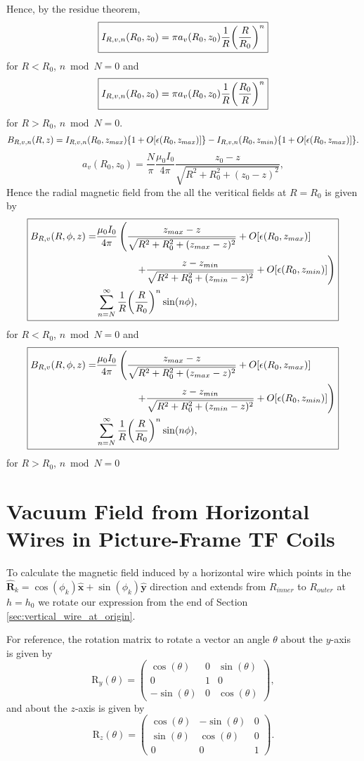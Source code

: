 \documentclass{article}
\begin{document}
Hence, by the residue theorem,
\[\boxed{I_{R,v,n}(R_0, z_0) = \pi a_v(R_0, z_0) \frac{1}{R}\qty(\frac{R}{R_0})^n}\]
for $R<R_0$, $n \bmod{N} = 0$
and
\[\boxed{I_{R,v,n}(R_0, z_0) = \pi a_v(R_0, z_0) \frac{1}{R}\qty(\frac{R_0}{R})^n}\]
for $R>R_0$, $n \bmod{N} = 0$.
\[\begin{aligned}
B_{R, v, n}(R, z)= I_{R,v,n}(R_0, z_{max})\qty{1+O[\epsilon(R_0, z_{max})]} - I_{R,v,n}(R_0, z_{min})\qty{1+O[\epsilon(R_0, z_{max})]}.
\end{aligned}\]
\[a_v(R_0, z_0)=\frac{N}{\pi}\frac{\mu_0 I_0}{4\pi}\frac{z_0-z}{\sqrt{R^2+R_0^2+(z_0-z)^2}},\]
Hence the radial magnetic field from the all the veritical fields at $R=R_0$ is given by
\[\boxed{
\begin{aligned}
B_{R,v}(R, \phi, z)=&\frac{\mu_0 I_0}{4\pi}\left(\frac{z_{max}-z}{\sqrt{R^2+R_0^2+(z_{max}-z)^2}}+O[\epsilon(R_0, z_{max})]\right. \\
& \qquad\qquad\left.+\frac{z-z_{min}}{\sqrt{R^2+R_0^2+(z_{min}-z)^2}}+O[\epsilon(R_0, z_{min})]\right) \\
& \sum_{n=N}^\infty \frac{1}{R}\qty(\frac{R}{R_0})^n\sin(n\phi),
\end{aligned}}
\]
for $R<R_0$, $n \bmod{N} = 0$ and
\[\boxed{
\begin{aligned}
B_{R,v}(R, \phi, z)=&\frac{\mu_0 I_0}{4\pi}\left(\frac{z_{max}-z}{\sqrt{R^2+R_0^2+(z_{max}-z)^2}}+O[\epsilon(R_0, z_{max})]\right. \\
& \qquad\qquad\left.+\frac{z-z_{min}}{\sqrt{R^2+R_0^2+(z_{min}-z)^2}}+O[\epsilon(R_0, z_{min})]\right) \\
& \sum_{n=N}^\infty \frac{1}{R}\qty(\frac{R}{R_0})^n\sin(n\phi),
\end{aligned}}
\]
for $R>R_0$, $n \bmod{N} = 0$


\section{Vacuum Field from Horizontal Wires in Picture-Frame TF Coils}

To calculate the magnetic field induced by a horizontal wire which points in the $\mathbf{\hat{R}}_k=\cos(\phi_k)\mathbf{\hat{x}} + \sin(\phi_k)\mathbf{\hat{y}}$
direction and extends from $R_{inner}$ to $R_{outer}$ at $h=h_0$ we rotate our expression
from the end of Section \ref{sec:vertical_wire_at_origin}.

For reference, the rotation matrix to rotate a vector an angle $\theta$ about the
$y$-axis is given by
\[\text{R}_y(\theta) = \begin{pmatrix}
    \cos(\theta) & 0 & \sin(\theta) \\
    0 & 1 & 0 \\
    -\sin(\theta) & 0 & \cos(\theta)
\end{pmatrix},\]
and about the $z$-axis is given by
\[\text{R}_z(\theta) = \begin{pmatrix}
    \cos(\theta) & -\sin(\theta) & 0 \\
    \sin(\theta) & \cos(\theta) & 0 \\
    0 & 0 & 1
\end{pmatrix}.\]
\end{document}
